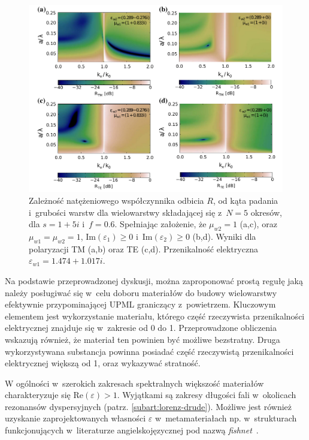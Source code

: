 \begin{figure}[tb]
	\includegraphics[width=\textwidth]{images/pml/fig5.png}
	\caption{Zależność natężeniowego współczynnika odbicia $R$, od kąta padania i~grubości warstw dla wielowarstwy składającej się z~$N=5$ okresów, dla $s=1+5i$ i~$f=0.6$. Spełniając założenie, że $\mu_{w2}=1$ (a,c), oraz $\mu_{w1}=\mu_{w2}=1$, $\textrm{Im}(\varepsilon_1)\ge 0 $ i~$\textrm{Im}(\varepsilon_2)\ge 0 $ (b,d). Wyniki dla polaryzacji TM (a,b) oraz TE (c,d). Przenikalność elektryczna $\varepsilon_{w1}=1.474+1.017i$.}
	\label{fig:pml-real-ref}
\end{figure}


Na podstawie przeprowadzonej dyskusji, można zaproponować prostą regułę jaką należy posługiwać się w~celu doboru materiałów do budowy wielowarstwy efektywnie przypominającej UPML graniczący z~powietrzem. Kluczowym elementem jest wykorzystanie materiału, którego część rzeczywista przenikalności elektrycznej znajduje się w~zakresie od 0 do 1. Przeprowadzone obliczenia wskazują również, że materiał ten powinien być możliwe bezstratny. Druga wykorzystywana substancja powinna posiadać część rzeczywistą przenikalności elektrycznej większą od 1, oraz wykazywać stratność. 

W ogólności w~szerokich zakresach spektralnych większość materiałów charakteryzuje się $\textrm{Re}(\varepsilon) > 1$. Wyjątkami są zakresy długości fali w~okolicach rezonansów dyspersyjnych (patrz. \ref{subart:lorenz-drude}). Możliwe jest również uzyskanie zaprojektowanych własności $\varepsilon$ w~metamateriałach np. w~strukturach funkcjonujących w~literaturze angielskojęzycznej pod nazwą \textit{fishnet}~\cite{valentine2008three}. 

